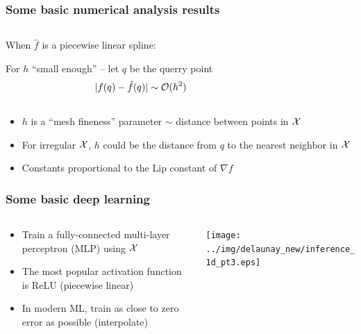 \documentclass[aspectratio=169]{beamer}
\begin{document}
\begin{frame}
\frametitle{Some basic numerical analysis results}

\begin{columns}
\begin{column}{0.5\textwidth}
When ${\hat f}$ is a piecewise linear spline:

\bigskip

For $h$ ``small enough'' -- let $q$ be the querry point
$$
|f(q) - {\hat f}(q)| \sim {\cal O}( h^2)
$$
\end{column}
\begin{column}{0.5\textwidth}


\end{column}
\end{columns}
\begin{itemize}
\item $h$ is a ``mesh fineness'' parameter $\sim$ distance between points in ${\cal X}$
\item For irregular ${\cal X}$, $h$ could be the distance from $q$ to the nearest neighbor in ${\cal X}$
\item Constants proportional to the Lip constant of $\nabla f$
\end{itemize}
\end{frame}

\begin{frame}
\frametitle{Some basic deep learning}
\begin{columns}
\begin{column}{0.5\textwidth}
\begin{itemize}
\item Train a fully-connected multi-layer perceptron (MLP) using ${\cal X}$
\item The most popular activation function is ReLU (piecewise linear)
\item In modern ML, train as close to zero error as possible (interpolate)
\end{itemize}
\end{column}

\begin{column}{0.5\textwidth}
\pause
\begin{center}
\texttt{[image: ../img/delaunay\_new/inference\_1d\_pt3.eps]}
\end{center}
\end{column}
\end{columns}
\end{frame}
\end{document}
